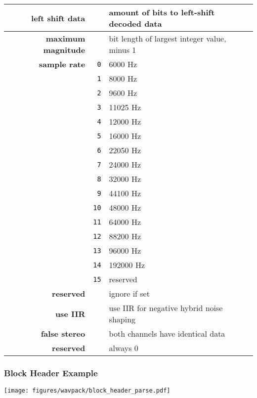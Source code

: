\begin{table}[h]
{\begin{tabular}{rrl}
\hline
\textbf{left shift data} & & amount of bits to left-shift decoded data \\
\hline
\textbf{maximum magnitude} & & bit length of largest integer value, minus 1 \\
\hline
\textbf{sample rate} & \texttt{0} & 6000 Hz \\
& \texttt{1} & 8000 Hz \\
& \texttt{2} & 9600 Hz \\
& \texttt{3} & 11025 Hz \\
& \texttt{4} & 12000 Hz \\
& \texttt{5} & 16000 Hz \\
& \texttt{6} & 22050 Hz \\
& \texttt{7} & 24000 Hz \\
& \texttt{8} & 32000 Hz \\
& \texttt{9} & 44100 Hz \\
& \texttt{10} & 48000 Hz \\
& \texttt{11} & 64000 Hz \\
& \texttt{12} & 88200 Hz \\
& \texttt{13} & 96000 Hz \\
& \texttt{14} & 192000 Hz \\
& \texttt{15} & reserved \\
\hline
\textbf{reserved} & & ignore if set \\
\hline
\textbf{use IIR} & & use IIR for negative hybrid noise shaping \\
\hline
\textbf{false stereo} & & both channels have identical data \\
\hline
\textbf{reserved} & & always 0 \\
\end{tabular}
}
\end{table}

\clearpage

\subsubsection{Block Header Example}
\texttt{[image: figures/wavpack/block\_header\_parse.pdf]}

\clearpage

